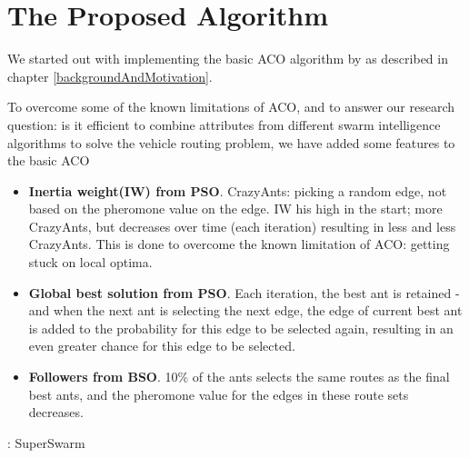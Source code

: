\section{The Proposed Algorithm}

We started out with implementing the basic ACO algorithm by \citet{nanda11} as described in chapter \ref{backgroundAndMotivation}.

To overcome some of the known limitations of ACO, and to answer our research question: is it efficient to combine attributes from different swarm intelligence algorithms to solve the vehicle routing problem, we have added some features to the basic ACO

\begin{itemize}
\item \textbf{Inertia weight(IW) from PSO}. CrazyAnts: picking a random edge, not based on the pheromone value on the edge. IW his high in the start; more CrazyAnts, but decreases over time (each iteration) resulting in less and less CrazyAnts. This is done to overcome the known limitation of ACO: getting stuck on local optima.
\item \textbf{Global best solution from PSO}. Each iteration, the best ant is retained - and when the next ant is selecting the next edge, the edge of current best ant is added to the probability for this edge to be selected again, resulting in an even greater chance for this edge to be selected.
\item \textbf{Followers from BSO}. 10\% of the ants selects the same routes as the final best ants, and the pheromone value for the edges in these route sets decreases.
\end{itemize}

: SuperSwarm

